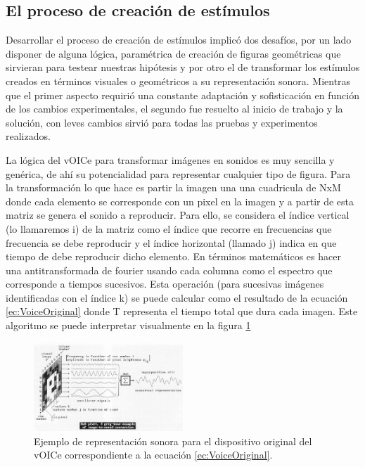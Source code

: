 \documentclass{article}
\begin{document}
\subsection{El proceso de creación de estímulos} \label{seccion:SVG}
    
    Desarrollar el proceso de creación de estímulos implicó dos desafíos, por un lado disponer de alguna lógica, paramétrica de creación de figuras geométricas que sirvieran para testear nuestras hipótesis y por otro el de transformar los estímulos creados en términos visuales o geométricos a su representación sonora. Mientras que el primer aspecto requirió una constante adaptación y sofisticación en función de los cambios experimentales, el segundo fue resuelto al inicio de trabajo y la solución, con leves cambios sirvió para todas las pruebas y experimentos realizados. 
    
    La lógica del vOICe para transformar imágenes en sonidos es muy sencilla y genérica, de ahí su potencialidad para representar cualquier tipo de figura. Para la transformación lo que hace es partir la imagen una una cuadricula de NxM donde cada elemento se corresponde con un pixel en la imagen y a partir de esta matriz se genera el sonido a reproducir. Para ello, se considera el índice vertical (lo llamaremos i) de la matriz como el índice que recorre en frecuencias que frecuencia se debe reproducir y el índice horizontal (llamado j) indica en que tiempo de debe reproducir dicho elemento. En términos matemáticos es hacer una antitransformada de fourier usando cada columna como el espectro que corresponde a tiempos sucesivos. Esta operación (para sucesivas imágenes identificadas con el índice k) se puede calcular como el resultado de la ecuación \ref{ec:VoiceOriginal} donde T representa el tiempo total que dura cada imagen. Este algoritmo se puede interpretar visualmente en la figura \ref{fig:VoiceOriginal}
    
    \begin{figure}
        \center
        \includegraphics[width=0.5\textwidth]{Imagenes/VoiceOriginal.png}
        \caption{Ejemplo de representación sonora para el dispositivo original del vOICe \cite{Voice1} correspondiente a la ecuación \ref{ec:VoiceOriginal}.}
        \label{fig:VoiceOriginal}
    \end{figure}
    
\end{document}
